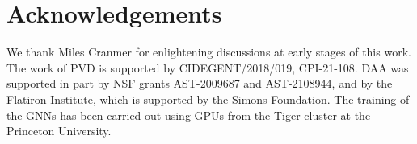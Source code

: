 \documentclass[twocolumn]{aastex631}
\begin{document}
\section*{Acknowledgements}  

We thank Miles Cranmer for enlightening discussions at early stages of this work. The work of PVD is supported by CIDEGENT/2018/019, CPI-21-108. DAA was supported in part by NSF grants AST-2009687 and AST-2108944, and by the Flatiron Institute, which is supported by the Simons Foundation. The training of the GNNs has been carried out using GPUs from the Tiger cluster at the Princeton University.





\end{document}

